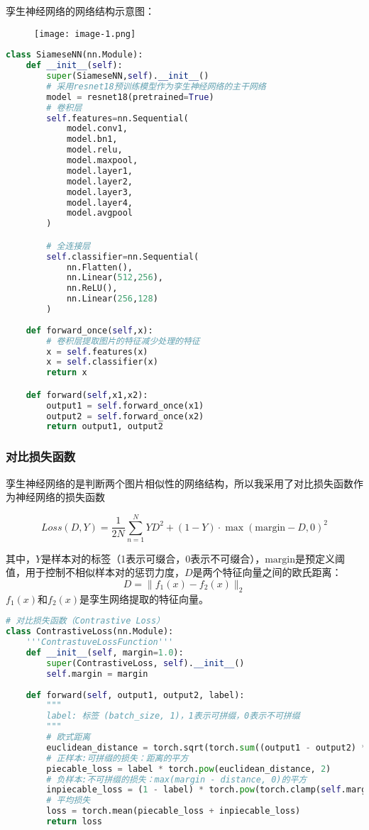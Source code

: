 \documentclass{article}
\begin{document}
孪生神经网络的网络结构示意图：
\begin{figure}[H]
\centering
\texttt{[image: image-1.png]}
\end{figure}

\begin{lstlisting}[language=Python]
class SiameseNN(nn.Module):
    def __init__(self):
        super(SiameseNN,self).__init__()
        # 采用resnet18预训练模型作为孪生神经网络的主干网络
        model = resnet18(pretrained=True)
        # 卷积层
        self.features=nn.Sequential(
            model.conv1,
            model.bn1,
            model.relu,
            model.maxpool,
            model.layer1,
            model.layer2,
            model.layer3,
            model.layer4,
            model.avgpool
        )

        # 全连接层
        self.classifier=nn.Sequential(
            nn.Flatten(),
            nn.Linear(512,256),
            nn.ReLU(),
            nn.Linear(256,128)
        )
    
    def forward_once(self,x):
        # 卷积层提取图片的特征减少处理的特征
        x = self.features(x)
        x = self.classifier(x)
        return x

    def forward(self,x1,x2):
        output1 = self.forward_once(x1)
        output2 = self.forward_once(x2)
        return output1, output2
\end{lstlisting}

\subsubsection{对比损失函数}

孪生神经网络的是判断两个图片相似性的网络结构，所以我采用了对比损失函数作为神经网络的损失函数

\[
Loss(D,Y)=\frac{1}{2N}\sum^{N}_{n=1}YD^2+(1-Y)\cdot\max(\text{margin}-D,0)^2
\tag{1}
\]

其中，$Y$是样本对的标签（1表示可缀合，0表示不可缀合），$\text{margin}$是预定义阈值，用于控制不相似样本对的惩罚力度，$D$是两个特征向量之间的欧氏距离：
\[
D = \|f_1(x)-f_2(x)\|_2
\tag{2}
\]
$f_1(x)$和$f_2(x)$是孪生网络提取的特征向量。

\begin{lstlisting}[language=Python]
# 对比损失函数（Contrastive Loss）
class ContrastiveLoss(nn.Module):
    '''ContrastuveLossFunction'''
    def __init__(self, margin=1.0):
        super(ContrastiveLoss, self).__init__()
        self.margin = margin
    
    def forward(self, output1, output2, label):
        """
        label: 标签 (batch_size, 1)，1表示可拼缀，0表示不可拼缀
        """
        # 欧式距离
        euclidean_distance = torch.sqrt(torch.sum((output1 - output2) ** 2, dim=1, keepdim=True))
        # 正样本:可拼缀的损失：距离的平方
        piecable_loss = label * torch.pow(euclidean_distance, 2)
        # 负样本:不可拼缀的损失：max(margin - distance, 0)的平方
        inpiecable_loss = (1 - label) * torch.pow(torch.clamp(self.margin - euclidean_distance, min=0.0), 2)
        # 平均损失
        loss = torch.mean(piecable_loss + inpiecable_loss)
        return loss
\end{lstlisting}
\end{document}
